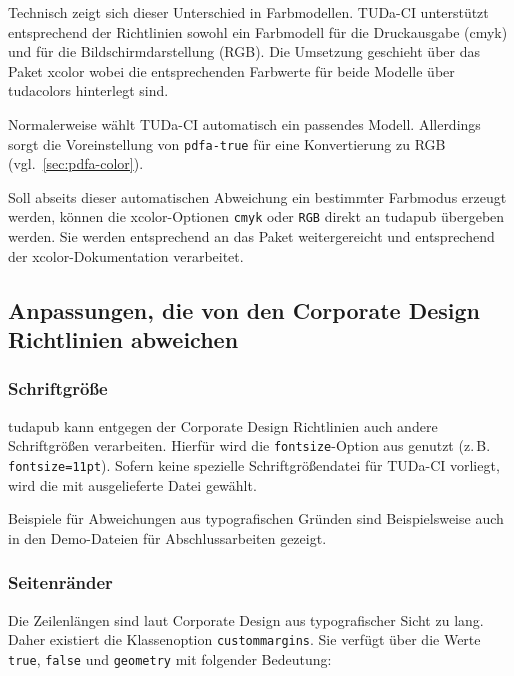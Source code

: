 \documentclass[
	ngerman,%
	accentcolor=9c,%
]{tudapub}
\newcommand*{\code}[1]{\texttt{#1}}
\newcommand*{\pkg}[1]{\textsf{#1}}
\newcommand*{\cls}[1]{\textsf{#1}}
\begin{document}
Technisch zeigt sich dieser Unterschied in Farbmodellen. TUDa-CI unterstützt entsprechend der Richtlinien sowohl ein Farbmodell für die Druckausgabe (cmyk) und für die Bildschirmdarstellung (RGB). Die Umsetzung geschieht über das Paket \pkg{xcolor} wobei die entsprechenden Farbwerte für beide Modelle über \pkg{tudacolors} hinterlegt sind.

Normalerweise wählt TUDa-CI automatisch ein passendes Modell. Allerdings sorgt die Voreinstellung von \code{pdfa-true} für eine Konvertierung zu RGB (vgl.~\ref{sec:pdfa-color}).

Soll abseits dieser automatischen Abweichung ein bestimmter Farbmodus erzeugt werden, können die \pkg{xcolor}-Optionen \code{cmyk} oder \code{RGB} direkt an \cls{tudapub} übergeben werden. Sie werden entsprechend an das Paket weitergereicht und entsprechend der \pkg{xcolor}-Dokumentation verarbeitet.

\subsection{Anpassungen, die von den Corporate Design Richtlinien abweichen}

\subsubsection{Schriftgröße}
\cls{tudapub} kann entgegen der Corporate Design Richtlinien auch andere Schriftgrößen verarbeiten. Hierfür wird die \code{fontsize}-Option aus \KOMAScript{} genutzt (z.\,B. \code{fontsize=11pt}). Sofern keine spezielle Schriftgrößendatei für TUDa-CI vorliegt, wird die mit \KOMAScript{} ausgelieferte Datei gewählt.

Beispiele für Abweichungen aus typografischen Gründen sind Beispielsweise auch in den Demo-Dateien für Abschlussarbeiten gezeigt.

\subsubsection{Seitenränder}
Die Zeilenlängen sind laut Corporate Design aus typografischer Sicht zu lang.
Daher existiert die Klassenoption \code{custommargins}. Sie verfügt über die Werte \code{true}, \code{false} und \code{geometry} mit folgender Bedeutung:
\end{document}
